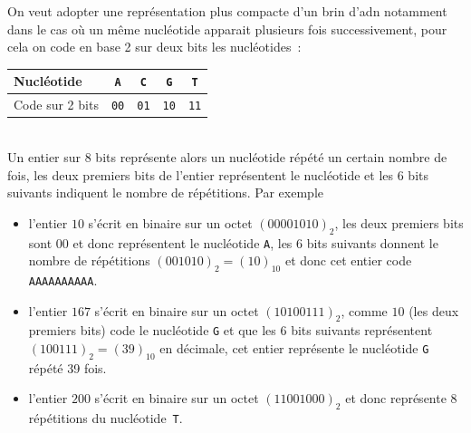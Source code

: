 \documentclass[11pt,a4paper]{article}
\begin{document}
\begin{Exercise}[title={Représentation et manipulation de l'{\sc adn}}, origin={\bac \; \sc capes nsi L3}]
    \bigskip{}
    On veut adopter une représentation plus compacte d'un brin d'{\sc adn} notamment dans le cas où un même nucléotide apparait plusieurs fois successivement, pour cela on code en base 2 sur deux bits les nucléotides~:\phantom{\strut} \\
    \begin{tabular}{|l|c|c|c|c|}
        \hline
        Nucléotide & {\tt A} & {\tt C} & {\tt G} & {\tt T} \\
        \hline
        Code sur 2 bits & {\tt 00} & {\tt 01} & {\tt 10} & {\tt 11} \\
        \hline
    \end{tabular}\\
    Un entier sur 8 bits représente alors un nucléotide répété un certain nombre de fois, les deux premiers bits de l'entier représentent le nucléotide et les 6 bits suivants indiquent le nombre de répétitions. Par exemple
    \begin{itemize}
    \item l'entier $10$ s'écrit en binaire sur un octet $(00001010)_2$, les deux premiers bits sont $00$ et donc représentent le nucléotide {\tt A}, les 6 bits suivants donnent le nombre de répétitions $(001010)_2 = (10)_{10}$ et donc cet entier code {\tt AAAAAAAAAA}.
    \item l'entier $167$ s'écrit en binaire sur un octet $(10100111)_2$, comme $10$ (les deux premiers bits) code le nucléotide {\tt G} et que les 6 bits suivants représentent $(100111)_2 = (39)_{10}$ en décimale, cet entier représente le nucléotide {\tt G} répété 39 fois.
    \item l'entier $200$ s'écrit en binaire sur un octet $(11001000)_2$ et donc représente 8 répétitions du nucléotide~{\tt T}.
    \end{itemize}
    \ifcorrige
    \fi
\end{Exercise}
\end{document}
